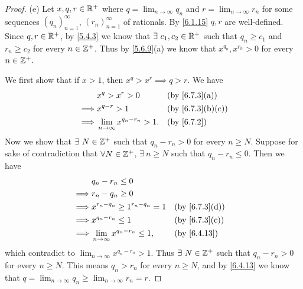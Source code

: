 \begin{proof}{(e)}
  Let \(x, q, r \in \mathbb{R}^+\) where \(q = \lim_{n \to \infty} q_n\) and \(r = \lim_{n \to \infty} r_n\) for some sequences \((q_n)_{n = 1}^\infty\), \((r_n)_{n = 1}^\infty\) of rationals.
  By \cref{6.1.15} \(q, r\) are well-defined.
  Since \(q, r \in \mathbb{R}^+\), by \cref{5.4.3} we know that \(\exists\ c_1, c_2 \in \mathbb{R}^+\) such that \(q_n \geq c_1\) and \(r_n \geq c_2\) for every \(n \in \mathbb{Z}^+\).
  Thus by \cref{5.6.9}(a) we know that \(x^{q_n}, x^{r_n} > 0\) for every \(n \in \mathbb{Z}^+\).

  We first show that if \(x > 1\), then \(x^q > x^r \implies q > r\).
  We have
  \begin{align*}
             & x^q > x^r > 0                          &  & \text{(by \cref{6.7.3}(a))}    \\
    \implies & x^{q - r} > 1                          &  & \text{(by \cref{6.7.3}(b)(c))} \\
    \implies & \lim_{n \to \infty} x^{q_n - r_n} > 1. &  & \by{6.7.2}                     \\
  \end{align*}
  Now we show that \(\exists\ N \in \mathbb{Z}^+\) such that \(q_n - r_n > 0\) for every \(n \geq N\).
  Suppose for sake of contradiction that \(\forall N \in \mathbb{Z}^+\), \(\exists\ n \geq N\) such that \(q_n - r_n \leq 0\).
  Then we have
  \begin{align*}
             & q_n - r_n \leq 0                                                           \\
    \implies & r_n - q_n \geq 0                                                           \\
    \implies & x^{r_n - q_n} \geq 1^{r_n - q_n} = 1      &  & \text{(by \cref{6.7.3}(d))} \\
    \implies & x^{q_n - r_n} \leq 1                      &  & \text{(by \cref{6.7.3}(c))} \\
    \implies & \lim_{n \to \infty} x^{q_n - r_n} \leq 1, &  & \text{(by \cref{6.4.13})}
  \end{align*}
  which contradict to \(\lim_{n \to \infty} x^{q_n - r_n} > 1\).
  Thus \(\exists\ N \in \mathbb{Z}^+\) such that \(q_n - r_n > 0\) for every \(n \geq N\).
  This means \(q_n > r_n\) for every \(n \geq N\), and by \cref{6.4.13} we know that \(q = \lim_{n \to \infty} q_n \geq \lim_{n \to \infty} r_n = r\).


\end{proof}
